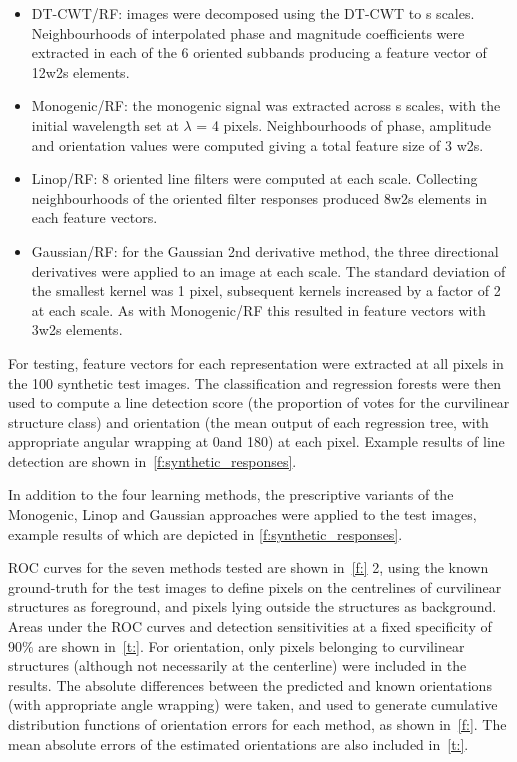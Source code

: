 \begin{itemize}
\item	DT-CWT/RF: images were decomposed using the DT-CWT to s scales. Neighbourhoods of interpolated phase and magnitude coefficients were extracted in each of the 6 oriented subbands producing a feature vector of 12w2s elements.
\item	Monogenic/RF: the monogenic signal was extracted across s scales, with the initial wavelength set at $\lambda$ = 4 pixels. Neighbourhoods of phase, amplitude and orientation values were computed giving a total feature size of 3 w2s. 
\item	Linop/RF: 8 oriented line filters were computed at each scale. Collecting neighbourhoods of the oriented filter responses produced 8w2s elements in each feature vectors.
\item	Gaussian/RF: for the Gaussian 2nd derivative method, the three directional derivatives were applied to an image at each scale. The standard deviation of the smallest kernel was 1 pixel, subsequent kernels increased by a factor of 2 at each scale. As with Monogenic/RF this resulted in feature vectors with 3w2s elements.
\end{itemize}

For testing, feature vectors for each representation were extracted at all pixels in the 100 synthetic test images. The classification and regression forests were then used to compute a line detection score (the proportion of votes for the curvilinear structure class) and orientation (the mean output of each regression tree, with appropriate angular wrapping at 0\deg and 180\deg) at each pixel. Example results of line detection are shown in~\ref{f:synthetic_responses}.

In addition to the four learning methods, the prescriptive variants of the Monogenic, Linop and Gaussian approaches were applied to the test images, example results of which are depicted in \ref{f:synthetic_responses}.

ROC curves for the seven methods tested are shown in~\ref{f:} 2, using the known ground-truth for the test images to define pixels on the centrelines of curvilinear structures as foreground, and pixels lying outside the structures as background. Areas under the ROC curves and detection sensitivities at a fixed specificity of 90\% are shown in~\ref{t:}. For orientation, only pixels belonging to curvilinear structures (although not necessarily at the centerline) were included in the results. The absolute differences between the predicted and known orientations (with appropriate angle wrapping) were taken, and used to generate cumulative distribution functions of orientation errors for each method, as shown in~\ref{f:}. The mean absolute errors of the estimated orientations are also included in~\ref{t:}.

